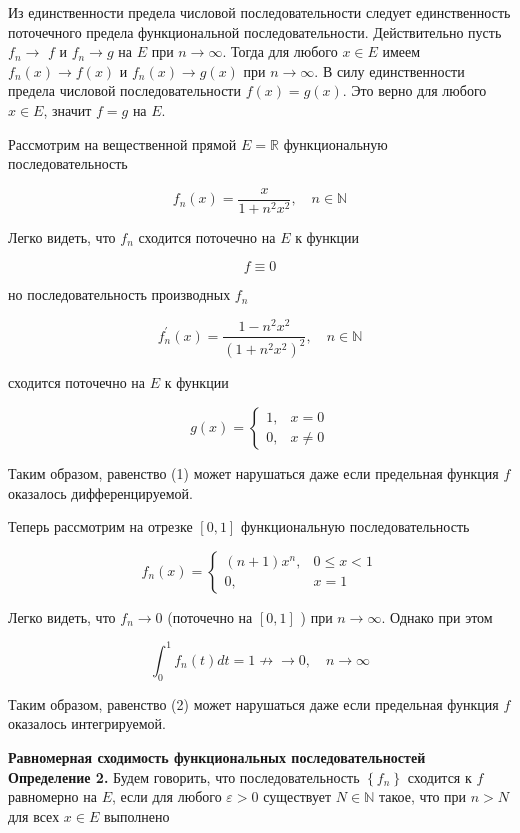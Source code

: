 \documentclass[a4paper,12pt]{article} %
\begin{document}
	Из единственности предела числовой последовательности следует единственность поточечного предела функциональной последовательности. Действительно пусть $f_{n} \rightarrow$ $f$ и $f_{n} \rightarrow g$ на $E$ при $n \rightarrow \infty$. Тогда для любого $x \in E$ имеем $f_{n}(x) \rightarrow f(x)$ и $f_{n}(x) \rightarrow g(x)$ при $n \rightarrow \infty$. В силу единственности предела числовой последовательности $f(x)=g(x)$. Это верно для любого $x \in E$, значит $f=g$ на $E$.
	
	Рассмотрим на вещественной прямой $E=\mathbb{R}$ функциональную последовательность
	
	$$
	f_{n}(x)=\frac{x}{1+n^{2} x^{2}}, \quad n \in \mathbb{N}
	$$
	
	Легко видеть, что $f_{n}$ сходится поточечно на $E$ к функции
	
	$$
	f \equiv 0
	$$
	
	но последовательность производных $f_{n}$
	
	$$
	f_{n}^{\prime}(x)=\frac{1-n^{2} x^{2}}{\left(1+n^{2} x^{2}\right)^{2}}, \quad n \in \mathbb{N}
	$$
	
	сходится поточечно на $E$ к функции
	
	$$
	g(x)= \begin{cases}1, & x=0 \\ 0, & x \neq 0\end{cases}
	$$
	
	Таким образом, равенство (1) может нарушаться даже если предельная функция $f$ оказалось дифференцируемой.
	
	Теперь рассмотрим на отрезке $[0,1]$ функциональную последовательность
	
	$$
	f_{n}(x)= \begin{cases}(n+1) x^{n}, & 0 \leq x<1 \\ 0, & x=1\end{cases}
	$$
	
	Легко видеть, что $f_{n} \rightarrow 0$ (поточечно на $[0,1]$ ) при $n \rightarrow \infty$. Однако при этом
	
	$$
	\int_{0}^{1} f_{n}(t) d t=1 \nrightarrow \rightarrow 0, \quad n \rightarrow \infty
	$$
	
	Таким образом, равенство (2) может нарушаться даже если предельная функция $f$ оказалось интегрируемой.
	
	\textbf{Равномерная сходимость функциональных последовательностей}\\
	\textbf{Определение 2.} Будем говорить, что последовательность $\left\{f_{n}\right\}$ сходится к $f$ равномерно на $E$, если для любого $\varepsilon>0$ существует $N \in \mathbb{N}$ такое, что при $n>N$ для всех $x \in E$ выполнено
	
\end{document}
